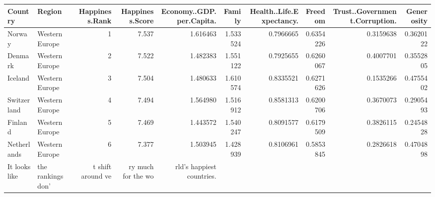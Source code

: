 \documentclass[]{article}
\newenvironment{Shaded}{\begin{snugshade}}{\end{snugshade}}
\newcommand{\DataTypeTok}[1]{\textcolor[rgb]{0.13,0.29,0.53}{#1}}
\newcommand{\DecValTok}[1]{\textcolor[rgb]{0.00,0.00,0.81}{#1}}
\newcommand{\KeywordTok}[1]{\textcolor[rgb]{0.13,0.29,0.53}{\textbf{#1}}}
\newcommand{\NormalTok}[1]{#1}
\newcommand{\OperatorTok}[1]{\textcolor[rgb]{0.81,0.36,0.00}{\textbf{#1}}}
\newcommand{\StringTok}[1]{\textcolor[rgb]{0.31,0.60,0.02}{#1}}
\begin{document}
\begin{Shaded}
\end{Shaded}

\begin{longtable}[]{@{}llrrrrrrrr@{}}
\toprule
Country & Region & Happiness.Rank & Happiness.Score &
Economy..GDP.per.Capita. & Family & Health..Life.Expectancy. & Freedom &
Trust..Government.Corruption. & Generosity\tabularnewline
\midrule
\endhead
Norway & Western Europe & 1 & 7.537 & 1.616463 & 1.533524 & 0.7966665 &
0.6354226 & 0.3159638 & 0.3620122\tabularnewline
Denmark & Western Europe & 2 & 7.522 & 1.482383 & 1.551122 & 0.7925655 &
0.6260067 & 0.4007701 & 0.3552805\tabularnewline
Iceland & Western Europe & 3 & 7.504 & 1.480633 & 1.610574 & 0.8335521 &
0.6271626 & 0.1535266 & 0.4755402\tabularnewline
Switzerland & Western Europe & 4 & 7.494 & 1.564980 & 1.516912 &
0.8581313 & 0.6200706 & 0.3670073 & 0.2905493\tabularnewline
Finland & Western Europe & 5 & 7.469 & 1.443572 & 1.540247 & 0.8091577 &
0.6179509 & 0.3826115 & 0.2454828\tabularnewline
Netherlands & Western Europe & 6 & 7.377 & 1.503945 & 1.428939 &
0.8106961 & 0.5853845 & 0.2826618 & 0.4704898\tabularnewline
It looks like & the rankings don' & t shift around ve & ry much for the
wo & rld's happiest countries. & & & & &\tabularnewline
\bottomrule
\end{longtable}
\end{document}
